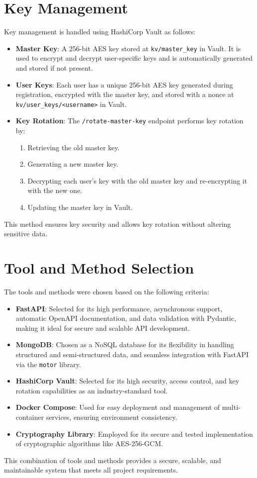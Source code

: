 \documentclass[a4paper,12pt]{article}
\begin{document}
\section{Key Management}
Key management is handled using HashiCorp Vault as follows:
\begin{itemize}
    \item \textbf{Master Key}: A 256-bit AES key stored at \texttt{kv/master\_key} in Vault. It is used to encrypt and decrypt user-specific keys and is automatically generated and stored if not present.
    \item \textbf{User Keys}: Each user has a unique 256-bit AES key generated during registration, encrypted with the master key, and stored with a nonce at \texttt{kv/user\_keys/<username>} in Vault.
    \item \textbf{Key Rotation}: The \texttt{/rotate-master-key} endpoint performs key rotation by:
    \begin{enumerate}
        \item Retrieving the old master key.
        \item Generating a new master key.
        \item Decrypting each user's key with the old master key and re-encrypting it with the new one.
        \item Updating the master key in Vault.
    \end{enumerate}
\end{itemize}
This method ensures key security and allows key rotation without altering sensitive data.

\section{Tool and Method Selection}
The tools and methods were chosen based on the following criteria:
\begin{itemize}
    \item \textbf{FastAPI}: Selected for its high performance, asynchronous support, automatic OpenAPI documentation, and data validation with Pydantic, making it ideal for secure and scalable API development.
    \item \textbf{MongoDB}: Chosen as a NoSQL database for its flexibility in handling structured and semi-structured data, and seamless integration with FastAPI via the \texttt{motor} library.
    \item \textbf{HashiCorp Vault}: Selected for its high security, access control, and key rotation capabilities as an industry-standard tool.
    \item \textbf{Docker Compose}: Used for easy deployment and management of multi-container services, ensuring environment consistency.
    \item \textbf{Cryptography Library}: Employed for its secure and tested implementation of cryptographic algorithms like AES-256-GCM.
\end{itemize}
This combination of tools and methods provides a secure, scalable, and maintainable system that meets all project requirements.
\end{document}
